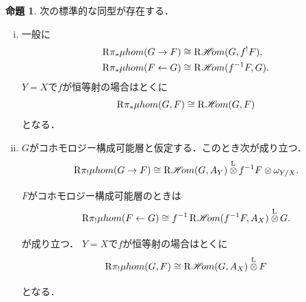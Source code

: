 \documentclass[leqno, 10pt, a4paper, dvipdfmx]{jsarticle}
\theoremstyle{definition}
\numberwithin{equation}{section}
\newcommand{\HOM}{\mathop{\mathscr{H}\hspace{-2pt}om}\nolimits}%
\newcommand{\RHOM}{\mathop{\mathrm{R}\hspace{-1.5pt}\HOM}\nolimits}
\newcommand{\Rder}{\mathrm{R}}
\newcommand{\tens}[1][]{\mathbin{\otimes_{\raise1.5ex\hbox to-.1em{}{#1}}}}
\newcommand{\lltens}[1][]{\mathbin{{\mathop{\tens}\limits^{\mathrm{L}}_{#1}}}}
\theoremstyle{mystyle}
\newtheorem{PRP}[AXM]{命題}
\renewenvironment{leftbar}{%
  \def\FrameCommand{\textcolor{lightgray}{\vrule width 4pt} \hspace{10pt}}%
  \MakeFramed {\advance\hsize-\width \FrameRestore}}%
{\endMakeFramed}
\newcommand{\muhom}{\mu hom}
\begin{document}
\begin{leftbar}
\begin{PRP}\label{prp4.4.2}
  次の標準的な同型が存在する．
  \begin{enumerate}[(i)]
    \item 一般に
    \begin{align*}
      \Rder{\pi_{\ast}}\muhom(G\to F)&\cong\RHOM(G,f^{!}F),\\
      \Rder{\pi_{\ast}}\muhom(F\leftarrow G)&\cong\RHOM(f^{-1}F,G).
    \end{align*}
    \(Y=X\)で\(f\)が恒等射の場合はとくに\[
      \Rder{\pi_{\ast}}\muhom(G, F)\cong\RHOM(G,F)
    \]
    となる．
    \item \(G\)がコホモロジー構成可能層と仮定する．このとき次が成り立つ．\[
      \Rder{\pi_{!}}\muhom(G\to F)
      \cong
      \RHOM(G,A_Y)\lltens[]f^{-1}F\tens[]\omega_{Y/X}.
    \]
    \(F\)がコホモロジー構成可能層のときは
    \[
      \Rder{\pi_{!}}\muhom(F\leftarrow G)
      \cong
      f^{-1}\RHOM(f^{-1}F,A_X)\lltens[]G.
    \]が成り立つ．
    \(Y=X\)で\(f\)が恒等射の場合はとくに\[
      \Rder{\pi_{!}}\muhom(G, F)\cong\RHOM(G,A_X)\lltens[]F
    \]
    となる．
  \end{enumerate}
\end{PRP}
\end{leftbar}
\end{document}
